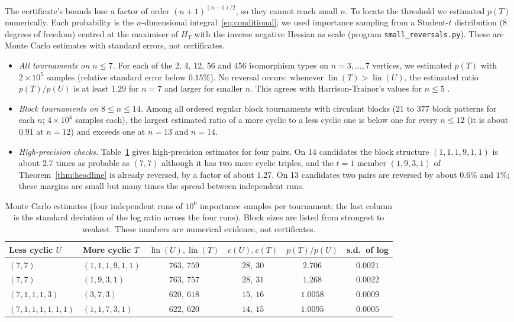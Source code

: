 \documentclass[11pt,a4paper]{article}
\theoremstyle{definition}
\DeclareMathOperator{\lin}{lin}
\begin{document}
The certificate's bounds lose a factor of order $(n+1)^{(n-1)/2}$, so they cannot reach small $n$. To locate the threshold we estimated $p(T)$ numerically. Each probability is the $n$-dimensional integral~\eqref{eq:conditional}; we used importance sampling from a Student-$t$ distribution (8 degrees of freedom) centred at the maximiser of $H_T$ with the inverse negative Hessian as scale (program \texttt{small\_reversals.py}). These are Monte Carlo estimates with standard errors, not certificates.

\begin{itemize}[leftmargin=*]
\item \emph{All tournaments on $n\le7$.} For each of the 2, 4, 12, 56 and 456 isomorphism types on $n=3,\dots,7$ vertices, we estimated $p(T)$ with $2\times10^5$ samples (relative standard error below $0.15\%$). No reversal occurs: whenever $\lin(T)>\lin(U)$, the estimated ratio $p(T)/p(U)$ is at least $1.29$ for $n=7$ and larger for smaller $n$. This agrees with Harrison-Trainor's values for $n\le5$ \cite{harrison}.
\item \emph{Block tournaments on $8\le n\le 14$.} Among all ordered regular block tournaments with circulant blocks (21 to 377 block patterns for each $n$; $4\times10^4$ samples each), the largest estimated ratio of a more cyclic to a less cyclic one is below one for every $n\le12$ (it is about $0.91$ at $n=12$) and exceeds one at $n=13$ and $n=14$.
\item \emph{High-precision checks.} Table~\ref{tab:small} gives high-precision estimates for four pairs. On 14 candidates the block structure $(1,1,1,9,1,1)$ is about $2.7$ times as probable as $(7,7)$ although it has two more cyclic triples, and the $t=1$ member $(1,9,3,1)$ of Theorem~\ref{thm:headline} is already reversed, by a factor of about $1.27$. On 13 candidates two pairs are reversed by about $0.6\%$ and $1\%$; these margins are small but many times the spread between independent runs.
\end{itemize}

\begin{table}[htbp]
\centering
\begin{tabular}{llcccc}
\toprule
Less cyclic $U$ & More cyclic $T$ & $\lin(U),\lin(T)$ & $c(U),c(T)$ & $p(T)/p(U)$ & s.d.\ of log\\
\midrule
$(7,7)$ & $(1,1,1,9,1,1)$ & $763,\ 759$ & $28,\ 30$ & $2.706$ & $0.0021$\\
$(7,7)$ & $(1,9,3,1)$ & $763,\ 757$ & $28,\ 31$ & $1.268$ & $0.0022$\\
$(7,1,1,1,3)$ & $(3,7,3)$ & $620,\ 618$ & $15,\ 16$ & $1.0058$ & $0.0009$\\
$(7,1,1,1,1,1,1)$ & $(1,1,7,3,1)$ & $622,\ 620$ & $14,\ 15$ & $1.0095$ & $0.0005$\\
\bottomrule
\end{tabular}
\caption{Monte Carlo estimates (four independent runs of $10^6$ importance samples per tournament; the last column is the standard deviation of the log ratio across the four runs). Block sizes are listed from strongest to weakest. These numbers are numerical evidence, not certificates.}\label{tab:small}
\end{table}
\end{document}
